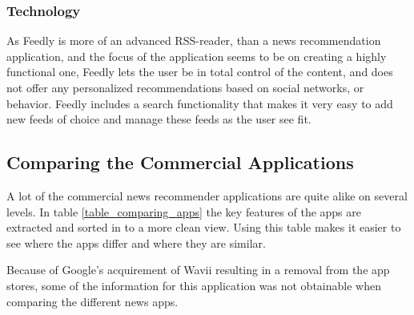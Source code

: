 \subsubsection{Technology}
As Feedly is more of an advanced RSS-reader, than a news recommendation application, and the focus of the application seems to be on creating a highly functional one, Feedly lets the user be in total control of the content, and does not offer any personalized recommendations based on social networks, or behavior. Feedly includes a search functionality that makes it very easy to add new feeds of choice and manage these feeds as the user see fit.

\subsection{Comparing the Commercial Applications}
A lot of the commercial news recommender applications are quite alike on several levels. In table \ref{table_comparing_apps} the key features of the apps are extracted and sorted in to a more clean view. Using this table makes it easier to see where the apps differ and where they are similar. 

Because of Google's acquirement of Wavii resulting in a removal from the app stores, some of the information for this application was not obtainable when comparing the different news apps.


